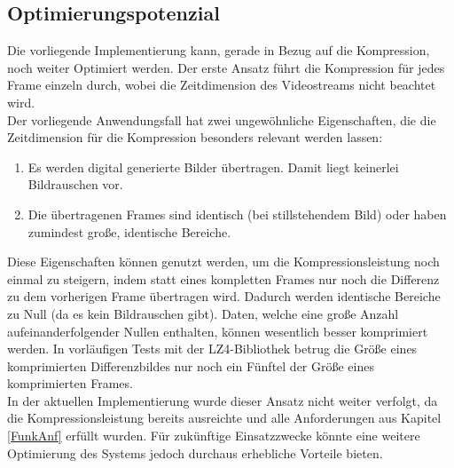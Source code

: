 \subsection{Optimierungspotenzial}
Die vorliegende Implementierung kann, gerade in Bezug auf die Kompression, noch weiter Optimiert werden. Der erste Ansatz führt die Kompression für jedes Frame einzeln durch, wobei die Zeitdimension des Videostreams nicht beachtet wird.\\
Der vorliegende Anwendungsfall hat zwei ungewöhnliche Eigenschaften, die die Zeitdimension für die Kompression besonders relevant werden lassen:
\begin{enumerate}
\item{Es werden digital generierte Bilder übertragen. Damit liegt keinerlei Bildrauschen vor.}
\item{Die übertragenen Frames sind identisch (bei stillstehendem Bild) oder haben zumindest große, identische Bereiche.}
\end{enumerate}

Diese Eigenschaften können genutzt werden, um die Kompressionsleistung noch einmal zu steigern, indem statt eines kompletten Frames nur noch die Differenz zu dem vorherigen Frame übertragen wird. Dadurch werden identische Bereiche zu Null (da es kein Bildrauschen gibt). Daten, welche eine große Anzahl aufeinanderfolgender Nullen enthalten, können wesentlich besser komprimiert werden. In vorläufigen Tests mit der LZ4-Bibliothek betrug die Größe eines komprimierten Differenzbildes nur noch ein Fünftel der Größe eines komprimierten Frames.\\
In der aktuellen Implementierung wurde dieser Ansatz nicht weiter verfolgt, da die Kompressionsleistung bereits ausreichte und alle Anforderungen aus Kapitel \ref{FunkAnf} erfüllt wurden. Für zukünftige Einsatzzwecke könnte eine weitere Optimierung des Systems jedoch durchaus erhebliche Vorteile bieten.

